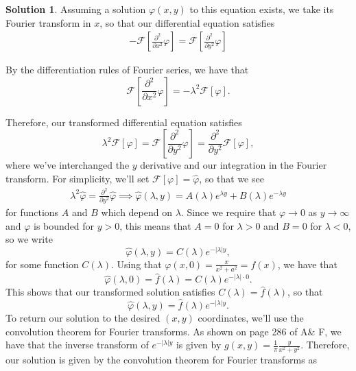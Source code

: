 \documentclass[12pt]{article}
\newcommand{\abs}[1]{ \left| #1 \right| }
\renewcommand{\phi}{\varphi}
\theoremstyle{definition}
\newtheorem{sol}{Solution}
\theoremstyle{remark}
\begin{document}
\begin{sol}
    Assuming a solution $\phi(x,y)$ to this equation exists, we take its Fourier transform in $x$, so that our differential equation satisfies
\begin{align*}
    -\mathcal{F}\left[ \frac{\partial^{2}}{\partial x^{2}} \phi \right] =  \mathcal{F} \left[\frac{\partial^{2}}{\partial y^{2}} \phi\right]  
\end{align*}

By the differentiation rules of Fourier series, we have that
\begin{equation*}
  \mathcal{F}\left[\frac{\partial^{2}}{\partial x^{2}}  \phi \right]  = - \lambda^{2} \mathcal{F}[ \phi ].
\end{equation*}

Therefore, our transformed differential equation satisfies
\begin{equation*}
    \lambda^{2} \mathcal{F}[ \phi ] = \mathcal{F} \left[\frac{\partial^{2}}{\partial y^{2}} \phi\right] = \frac{\partial^{2}}{\partial y^{2}} \mathcal{F} \left[\phi\right], 
\end{equation*}
where we've interchanged the $y$ derivative and our integration in the Fourier transform. For simplicity, we'll set $\mathcal{F}[\phi] = \hat{\phi}$, so that we see
\begin{align*}
    \lambda^{2} \hat{\phi} =  \frac{\partial^{2}}{\partial y^{2}}  \hat{\phi} \implies 
    \hat{\phi}(\lambda, y) = A(\lambda) e^{\lambda y} + B(\lambda) e^{- \lambda y}
\end{align*}
for functions $A$ and $B$ which depend on $\lambda$. Since we require that $\phi \to 0$ as $y\to \infty$ and $\phi$ is bounded for $y>0$, this means that $A = 0$ for $\lambda > 0$ and $B = 0$ for $\lambda < 0$, so we write
\begin{equation*}
    \hat{\phi}(\lambda, y) = C(\lambda) e^{- \abs{\lambda}y},
 \end{equation*}
 for some function $C(\lambda)$. Using that $\phi(x, 0) = \frac{x}{x^{2} + a^{2}} = f(x)$, we have that 
 \begin{equation*}
     \hat{\phi}(\lambda, 0) = \hat{f}(\lambda) = C(\lambda) e^{-\abs{\lambda}\cdot 0}.
 \end{equation*}
 This shows that our transformed solution satisfies $C(\lambda) = \hat{f}(\lambda)$, so that
 \begin{equation*}
  \hat{\phi}(\lambda, y) = \hat{f}(\lambda) e^{- \abs{\lambda}y}.
 \end{equation*}
 To return our solution to the desired $(x,y)$ coordinates, we'll use the convolution theorem for Fourier transforms. As shown on page 286 of A\& F, we have that the inverse transform of $e^{-\abs{\lambda}y}$ is given by $g(x,y) = \frac{1}{\pi} \frac{y}{x^{2}+ y^{2}}$. Therefore, our solution is given by the convolution theorem for Fourier transforms as


\end{sol}
\end{document}

